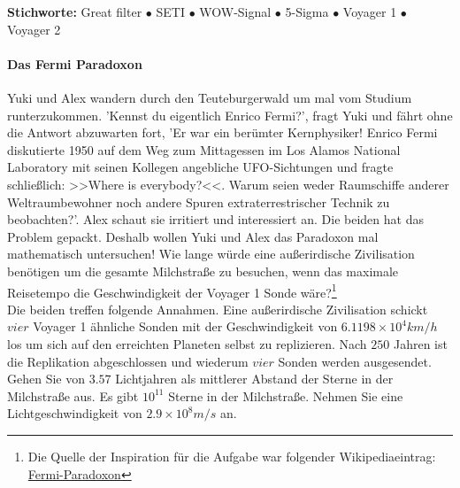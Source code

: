 \documentclass[a4paper, 9pt]{scrartcl}\usepackage[]{graphicx}\usepackage[]{xcolor}
\begin{document}
{\tiny\textbf{Stichworte:} Great filter $\bullet$ SETI $\bullet$ WOW-Signal $\bullet$ 5-Sigma $\bullet$ Voyager 1 $\bullet$ Voyager 2}




\paragraph{Das Fermi Paradoxon}



Yuki und Alex wandern durch den Teuteburgerwald um mal vom Studium runterzukommen. 'Kennst du eigentlich Enrico Fermi?', fragt Yuki und fährt ohne die Antwort abzuwarten fort, 'Er war ein berümter Kernphysiker! Enrico Fermi diskutierte 1950 auf dem Weg zum Mittagessen im Los Alamos National Laboratory mit seinen Kollegen angebliche UFO-Sichtungen und fragte schließlich: >>Where is everybody?<<. Warum seien weder Raumschiffe anderer Weltraumbewohner noch andere Spuren extraterrestrischer Technik zu beobachten?'. Alex schaut sie irritiert und interessiert an. Die beiden hat das Problem gepackt. Deshalb wollen Yuki und Alex das Paradoxon mal mathematisch untersuchen! Wie lange würde eine außerirdische Zivilisation benötigen um die gesamte Milchstraße zu besuchen, wenn das maximale Reisetempo die Geschwindigkeit der Voyager 1 Sonde wäre?\footnote{Die Quelle der Inspiration für die Aufgabe war folgender Wikipediaeintrag: \href{https://de.wikipedia.org/wiki/Fermi-Paradoxon}{Fermi-Paradoxon}}\\[-1ex]

Die beiden treffen folgende Annahmen. Eine außerirdische Zivilisation schickt $vier$ Voyager 1 ähnliche Sonden mit der Geschwindigkeit von $\ensuremath{6.1198\times 10^{4}}km/h$ los um sich auf den erreichten Planeten selbst zu replizieren. Nach $250$ Jahren ist die Replikation abgeschlossen und wiederum $vier$ Sonden werden ausgesendet. Gehen Sie von $3.57$ Lichtjahren als mittlerer Abstand der Sterne in der Milchstraße aus. Es gibt $\ensuremath{10^{11}}$ Sterne in der Milchstraße. Nehmen Sie eine Lichtgeschwindigkeit von $\ensuremath{2.9\times 10^{8}}m/s$ an.
\end{document}
